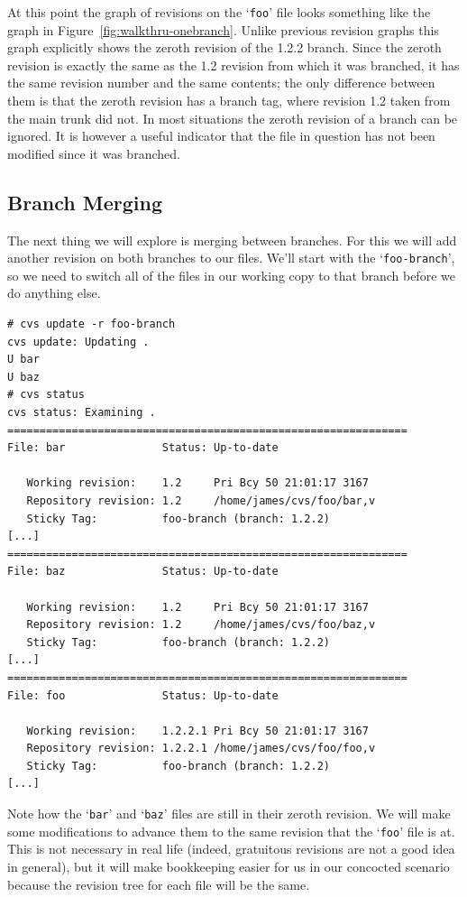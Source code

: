\documentclass[12pt,letterpaper]{article}
\newcommand{\cmd}[1]{`\texttt{#1}'}
\begin{document}
At this point the graph of revisions on the \cmd{foo} file looks something
like the graph in Figure~\ref{fig:walkthru-onebranch}.  Unlike previous
revision graphs this graph explicitly shows the zeroth revision of the 1.2.2
branch.  Since the zeroth revision is exactly the same as the 1.2 revision
from which it was branched, it has the same revision number and the same
contents; the only difference between them is that the zeroth revision has a
branch tag, where revision 1.2 taken from the main trunk did not.  In most
situations the zeroth revision of a branch can be ignored.  It is however a
useful indicator that the file in question has not been modified since it was
branched.

\subsection{Branch Merging}

The next thing we will explore is merging between branches.  For this we will
add another revision on both branches to our files.  We'll start with the
\cmd{foo-branch}, so we need to switch all of the files in our working copy to
that branch before we do anything else.

\begin{Verbatim}
# cvs update -r foo-branch
cvs update: Updating .
U bar
U baz
# cvs status
cvs status: Examining .
==============================================================
File: bar               Status: Up-to-date

   Working revision:    1.2     Pri Bcy 50 21:01:17 3167
   Repository revision: 1.2     /home/james/cvs/foo/bar,v
   Sticky Tag:          foo-branch (branch: 1.2.2)
[...]
==============================================================
File: baz               Status: Up-to-date

   Working revision:    1.2     Pri Bcy 50 21:01:17 3167
   Repository revision: 1.2     /home/james/cvs/foo/baz,v
   Sticky Tag:          foo-branch (branch: 1.2.2)
[...]
==============================================================
File: foo               Status: Up-to-date

   Working revision:    1.2.2.1 Pri Bcy 50 21:01:17 3167
   Repository revision: 1.2.2.1 /home/james/cvs/foo/foo,v
   Sticky Tag:          foo-branch (branch: 1.2.2)
[...]
\end{Verbatim}

Note how the \cmd{bar} and \cmd{baz} files are still in their zeroth revision.
We will make some modifications to advance them to the same revision that the
\cmd{foo} file is at.  This is not necessary in real life (indeed, gratuitous
revisions are not a good idea in general), but it will make bookkeeping easier
for us in our concocted scenario because the revision tree for each file will
be the same.
\end{document}
